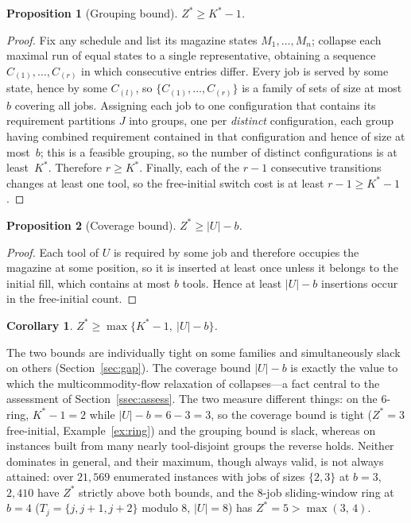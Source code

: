 \documentclass[11pt,a4paper]{article}
\theoremstyle{plain}
\newtheorem{proposition}{Proposition}
\newtheorem{corollary}{Corollary}
\theoremstyle{definition}
\theoremstyle{remark}
\newcommand{\U}{U}
\newcommand{\Kst}{K^{\ast}}
\newcommand{\Zst}{Z^{\ast}}
\newcommand{\rset}[1]{\{#1\}}
\begin{document}
\begin{proposition}[Grouping bound]\label{prop:lb1}
$\Zst\ge\Kst-1$.
\end{proposition}
\begin{proof}
Fix any schedule and list its magazine states $M_1,\dots,M_n$; collapse each
maximal run of equal states to a single representative, obtaining a sequence
$C_{(1)},\dots,C_{(r)}$ in which consecutive entries differ. Every job is served by
some state, hence by some $C_{(l)}$, so $\rset{C_{(1)},\dots,C_{(r)}}$ is a family of
sets of size at most $b$ covering all jobs. Assigning each job to one configuration
that contains its requirement partitions $J$ into groups, one per \emph{distinct}
configuration, each group having combined requirement contained in that
configuration and hence of size at most~$b$; this is a feasible grouping, so the
number of distinct configurations is at least~$\Kst$. Therefore $r\ge\Kst$. Finally,
each of the $r-1$ consecutive transitions changes at least one tool, so the
free-initial switch cost is at least $r-1\ge\Kst-1$.
\end{proof}

\begin{proposition}[Coverage bound]\label{prop:lb2}
$\Zst\ge\lvert\U\rvert-b$.
\end{proposition}
\begin{proof}
Each tool of $\U$ is required by some job and therefore occupies the magazine at
some position, so it is inserted at least once unless it belongs to the initial fill,
which contains at most $b$ tools. Hence at least $\lvert\U\rvert-b$ insertions occur
in the free-initial count.
\end{proof}

\begin{corollary}\label{cor:lb}
$\Zst\ge\max\rset{\Kst-1,\ \lvert\U\rvert-b}$.
\end{corollary}

\noindent The two bounds are individually tight on some families and simultaneously
slack on others (Section~\ref{sec:gap}). The coverage bound $\lvert\U\rvert-b$ is
exactly the value to which the multicommodity-flow relaxation of \citet{daSilva2024}
collapses---a fact central to the assessment of Section~\ref{ssec:assess}. The two
measure different things: on the $6$-ring, $\Kst-1=2$ while
$\lvert\U\rvert-b=6-3=3$, so the coverage bound is tight ($\Zst=3$ free-initial,
Example~\ref{ex:ring}) and the grouping bound is slack, whereas on instances built
from many nearly tool-disjoint groups the reverse holds. Neither dominates in
general, and their maximum, though always valid, is not always attained: over
$21{,}569$ enumerated instances with jobs of sizes $\{2,3\}$ at $b=3$, $2{,}410$
have $\Zst$ strictly above both bounds, and the $8$-job sliding-window ring at $b=4$
($T_j=\{j,j+1,j+2\}$ modulo $8$, $\lvert\U\rvert=8$) has $\Zst=5>\max(3,\,4)$.
\end{document}
